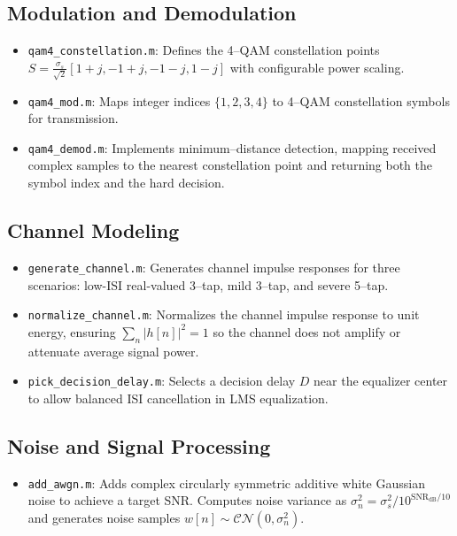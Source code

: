 \documentclass[12pt]{article}
\begin{document}
\subsection*{Modulation and Demodulation}
\begin{itemize}
\item \texttt{qam4\_constellation.m}: Defines the 4--QAM constellation points $S = \frac{\sigma_s}{\sqrt{2}}[1+j, -1+j, -1-j, 1-j]$ with configurable power scaling.
\item \texttt{qam4\_mod.m}: Maps integer indices $\{1,2,3,4\}$ to 4--QAM constellation symbols for transmission.
\item \texttt{qam4\_demod.m}: Implements minimum--distance detection, mapping received complex samples to the nearest constellation point and returning both the symbol index and the hard decision.
\end{itemize}

\subsection*{Channel Modeling}
\begin{itemize}
\item \texttt{generate\_channel.m}: Generates channel impulse responses for three scenarios: low-ISI real-valued 3--tap, mild 3--tap, and severe 5--tap.
\item \texttt{normalize\_channel.m}: Normalizes the channel impulse response to unit energy, ensuring $\sum_n |h[n]|^2 = 1$ so the channel does not amplify or attenuate average signal power.
\item \texttt{pick\_decision\_delay.m}: Selects a decision delay $D$ near the equalizer center to allow balanced ISI cancellation in LMS equalization.
\end{itemize}

\subsection*{Noise and Signal Processing}
\begin{itemize}
\item \texttt{add\_awgn.m}: Adds complex circularly symmetric additive white Gaussian noise to achieve a target SNR. Computes noise variance as $\sigma_n^2 = \sigma_s^2 / 10^{\text{SNR}_{\text{dB}}/10}$ and generates noise samples $w[n] \sim \mathcal{CN}(0, \sigma_n^2)$.
\end{itemize}
\end{document}
